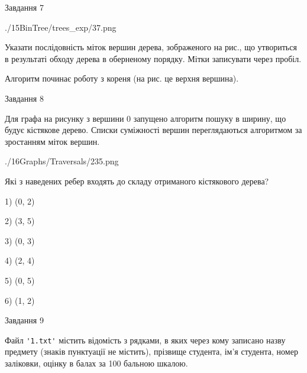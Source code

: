 \documentclass[12pt, ukrainian]{article}
\def\code#1{\Verb!#1!}
\begin{document}
{\vspace{10mm}\par

\newpage
\begin{minipage}[t]{9.7cm}
               
{\begin{center}Завдання {7}\end{center}}
\vspace{-6mm}

\begin{center}
	{./15BinTree/trees_exp/37.png}
\end{center}
Указати послідовність міток вершин дерева, зображеного на рис., що утвориться в результаті обходу дерева в оберненому порядку. Мітки записувати через пробіл.\par Алгоритм починає роботу з кореня (на рис. це верхня вершина).\par

\end{minipage}
\vline \hspace{8mm}
\begin{minipage}[t]{8.0cm}
               
{\begin{center}Завдання {8}\end{center}}
\vspace{-6mm}
Для графа на рисунку з вершини 0 запущено алгоритм пошуку в ширину, що будує кістякове дерево. Списки суміжності вершин переглядаються алгоритмом за зростанням міток вершин.\par
\begin{center}
	{./16Graphs/Traversals/235.png}
\end{center}
\par Які з наведених ребер входять до складу отриманого кістякового дерева?\par
1) (0, 2)\par
2) (3, 5)\par
3) (0, 3)\par
4) (2, 4)\par
5) (0, 5)\par
6) (1, 2)\par
{\vskip 15pt} \par

\end{minipage}

               
{\begin{center}Завдання {9}\end{center}}
\vspace{-6mm}
Файл \code{'1.txt'} містить відомість з рядками, в яких через кому записа\-но назву предмету (знаків пунктуації не містить), прізвище студента, ім'я студента, номер залі\-ков\-ки, оцінку в балах за 100 бальною шкалою.

}
\end{document}
